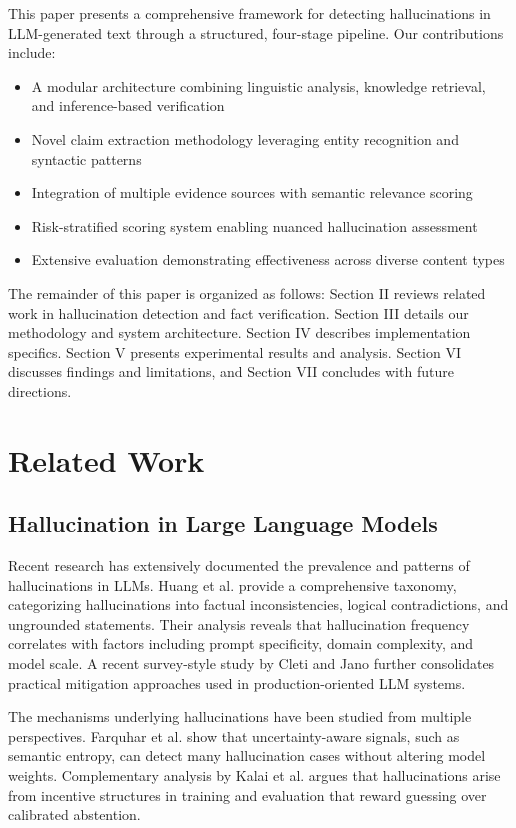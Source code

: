 \documentclass[conference]{IEEEtran}
\begin{document}
This paper presents a comprehensive framework for detecting hallucinations in LLM-generated text through a structured, four-stage pipeline. Our contributions include:

\begin{itemize}
\item A modular architecture combining linguistic analysis, knowledge retrieval, and inference-based verification
\item Novel claim extraction methodology leveraging entity recognition and syntactic patterns
\item Integration of multiple evidence sources with semantic relevance scoring
\item Risk-stratified scoring system enabling nuanced hallucination assessment
\item Extensive evaluation demonstrating effectiveness across diverse content types
\end{itemize}

The remainder of this paper is organized as follows: Section II reviews related work in hallucination detection and fact verification. Section III details our methodology and system architecture. Section IV describes implementation specifics. Section V presents experimental results and analysis. Section VI discusses findings and limitations, and Section VII concludes with future directions.

\section{Related Work}

\subsection{Hallucination in Large Language Models}

Recent research has extensively documented the prevalence and patterns of hallucinations in LLMs. Huang et al. \cite{survey_hallucination} provide a comprehensive taxonomy, categorizing hallucinations into factual inconsistencies, logical contradictions, and ungrounded statements. Their analysis reveals that hallucination frequency correlates with factors including prompt specificity, domain complexity, and model scale. A recent survey-style study by Cleti and Jano \cite{llmhallucination_types} further consolidates practical mitigation approaches used in production-oriented LLM systems.

The mechanisms underlying hallucinations have been studied from multiple perspectives. Farquhar et al. \cite{semantic_entropy} show that uncertainty-aware signals, such as semantic entropy, can detect many hallucination cases without altering model weights. Complementary analysis by Kalai et al. \cite{why_hallucinate} argues that hallucinations arise from incentive structures in training and evaluation that reward guessing over calibrated abstention.
\end{document}
